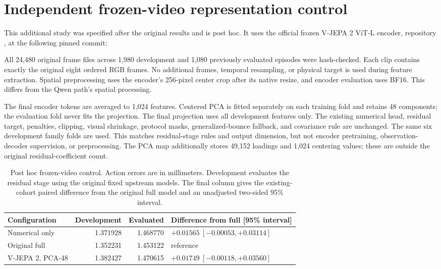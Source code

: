 \section{Independent frozen-video representation control}
This additional study was specified after the original results and is post hoc. It uses the official frozen V-JEPA 2 ViT-L encoder, repository , at the following pinned commit:
\par{}\par
All 24,480 original frame files across 1,980 development and 1,080 previously evaluated episodes were hash-checked. Each clip contains exactly the original eight ordered RGB frames. No additional frames, temporal resampling, or physical target is used during feature extraction. Spatial preprocessing uses the encoder's 256-pixel center crop after its native resize, and encoder evaluation uses BF16. This differs from the Qwen path's spatial processing.

The final encoder tokens are averaged to 1,024 features. Centered PCA is fitted separately on each training fold and retains 48 components; the evaluation fold never fits the projection. The final projection uses all development features only. The existing numerical head, residual target, penalties, clipping, visual shrinkage, protocol masks, generalized-bounce fallback, and covariance rule are unchanged. The same six development family folds are used. This matches residual-stage rules and output dimension, but not encoder pretraining, observation-decoder supervision, or preprocessing. The PCA map additionally stores 49,152 loadings and 1,024 centering values; these are outside the original residual-coefficient count.

\begin{table}[htbp]\centering\small
\caption{Post hoc frozen-video control. Action errors are in millimeters. Development evaluates the residual stage using the original fixed upstream models. The final column gives the existing-cohort paired difference from the original full model and an unadjusted two-sided 95\% interval.}
\begin{tabular}{lrrl}\toprule
Configuration & Development & Evaluated & Difference from full [95\% interval]\\\midrule
Numerical only & 1.371928 & 1.468770 & $+0.01565\ [-0.00053,+0.03114]$\\
Original full & 1.352231 & 1.453122 & reference\\
V-JEPA 2, PCA-48 & 1.382427 & 1.470615 & $+0.01749\ [-0.00118,+0.03560]$\\\bottomrule
\end{tabular}\end{table}

